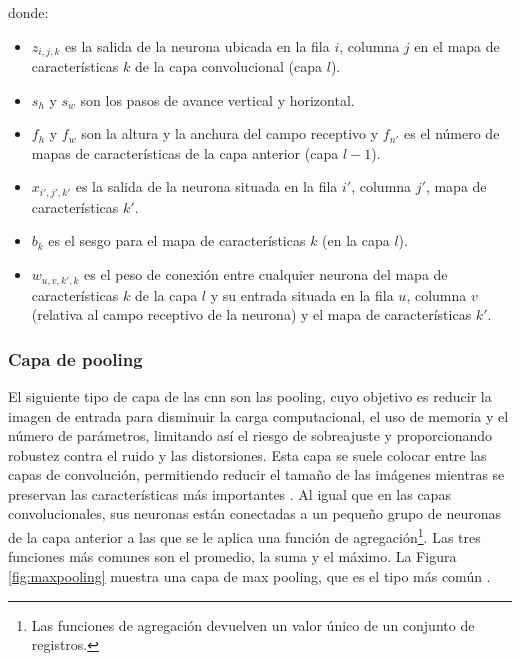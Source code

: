 donde:
\begin{itemize}
    \item \( z_{i,j,k} \) es la salida de la neurona ubicada en la fila \(i\), columna \(j\) en el mapa de características \(k\) de la capa convolucional (capa \(l\)).
    \item \( s_h \) y \( s_w \) son los pasos de avance vertical y horizontal.
    \item \( f_h \) y \( f_w \) son la altura y la anchura del campo receptivo y \( f_{n'} \) es el número de mapas de características de la capa anterior (capa \(l-1\)).
    \item \( x_{i',j',k'} \) es la salida de la neurona situada en la fila \(i'\), columna \(j'\), mapa de características \(k'\).
    \item \( b_k \) es el sesgo para el mapa de características \(k\) (en la capa \(l\)).
    \item \( w_{u,v,k',k} \) es el peso de conexión entre cualquier neurona del mapa de características \(k\) de la capa \(l\) y su entrada situada en la fila \(u\), columna \(v\) (relativa al campo receptivo de la neurona) y el mapa de características \(k'\).
\end{itemize}





\subsubsection*{Capa de pooling}

El siguiente tipo de capa de las \acrshort{cnn} son las pooling, cuyo objetivo es reducir la imagen de entrada para disminuir la carga computacional, el uso de memoria y el número de parámetros, limitando así el riesgo de sobreajuste y proporcionando robustez contra el ruido y las distorsiones. Esta capa se suele colocar entre las capas de convolución, permitiendo reducir el tamaño de las imágenes mientras se preservan las características más importantes \citep{podder2021artificial}. Al igual que en las capas convolucionales, sus neuronas están conectadas a un pequeño grupo de neuronas de la capa anterior a las que se le aplica una función de agregación\footnote{Las funciones de agregación devuelven un valor único de un conjunto de registros.}. Las tres funciones más comunes son el promedio, la suma y el máximo. La Figura \ref{fig:maxpooling} muestra una capa de max pooling, que es el tipo más común \citep{geron2022hands}. 



